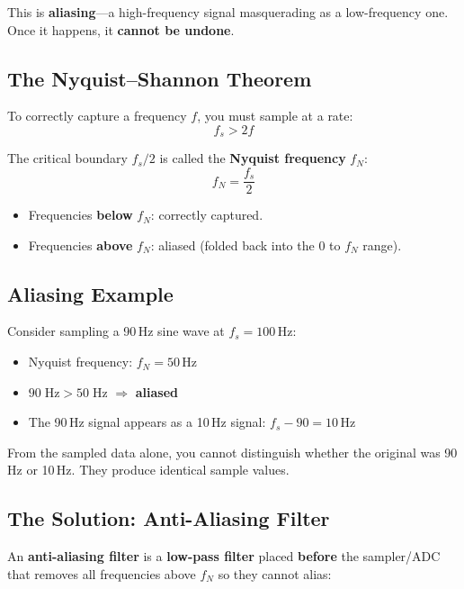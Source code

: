 \documentclass[12pt,a4paper]{article}
\begin{document}
This is \textbf{aliasing}---a high-frequency signal masquerading as a low-frequency one. Once it happens, it \textbf{cannot be undone}.

\subsection{The Nyquist--Shannon Theorem}

To correctly capture a frequency $f$, you must sample at a rate:
\begin{equation}
    f_s > 2f
\end{equation}

The critical boundary $f_s/2$ is called the \textbf{Nyquist frequency} $f_N$:
\begin{equation}
    f_N = \frac{f_s}{2}
\end{equation}

\begin{itemize}
    \item Frequencies \textbf{below} $f_N$: correctly captured.
    \item Frequencies \textbf{above} $f_N$: aliased (folded back into the $0$ to $f_N$ range).
\end{itemize}

\subsection{Aliasing Example}

Consider sampling a 90\,Hz sine wave at $f_s = 100$\,Hz:
\begin{itemize}
    \item Nyquist frequency: $f_N = 50$\,Hz
    \item $90\;\text{Hz} > 50\;\text{Hz}$ $\Rightarrow$ \textbf{aliased}
    \item The 90\,Hz signal appears as a 10\,Hz signal: $f_s - 90 = 10$\,Hz
\end{itemize}

From the sampled data alone, you cannot distinguish whether the original was 90\,Hz or 10\,Hz. They produce identical sample values.

\subsection{The Solution: Anti-Aliasing Filter}

An \textbf{anti-aliasing filter} is a \textbf{low-pass filter} placed \textbf{before} the sampler/ADC that removes all frequencies above $f_N$ so they cannot alias:
\end{document}
